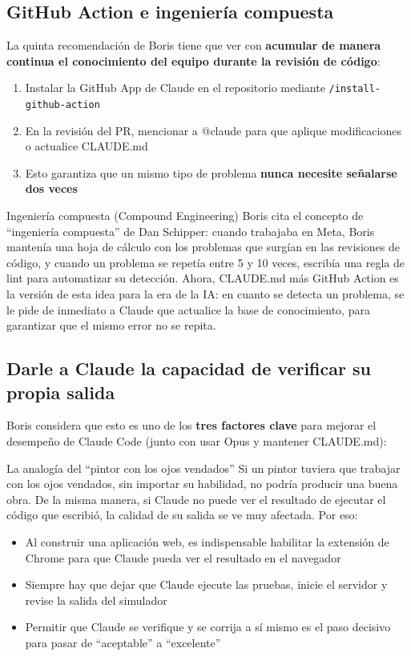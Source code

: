 \subsection{GitHub Action e ingeniería compuesta}

La quinta recomendación de Boris tiene que ver con \textbf{acumular de manera continua el conocimiento del equipo durante la revisión de código}:

\begin{enumerate}
    \item Instalar la GitHub App de Claude en el repositorio mediante \texttt{/install-github-action}
    \item En la revisión del PR, mencionar a @claude para que aplique modificaciones o actualice CLAUDE.md
    \item Esto garantiza que un mismo tipo de problema \textbf{nunca necesite señalarse dos veces}
\end{enumerate}

\begin{knowledgebox}{Ingeniería compuesta (Compound Engineering)}
Boris cita el concepto de ``ingeniería compuesta'' de Dan Schipper: cuando trabajaba en Meta, Boris mantenía una hoja de cálculo con los problemas que surgían en las revisiones de código, y cuando un problema se repetía entre 5 y 10 veces, escribía una regla de lint para automatizar su detección. Ahora, CLAUDE.md más GitHub Action es la versión de esta idea para la era de la IA: en cuanto se detecta un problema, se le pide de inmediato a Claude que actualice la base de conocimiento, para garantizar que el mismo error no se repita.
\end{knowledgebox}

\subsection{Darle a Claude la capacidad de verificar su propia salida}

Boris considera que esto es uno de los \textbf{tres factores clave} para mejorar el desempeño de Claude Code (junto con usar Opus y mantener CLAUDE.md):

\begin{warningbox}{La analogía del ``pintor con los ojos vendados''}
Si un pintor tuviera que trabajar con los ojos vendados, sin importar su habilidad, no podría producir una buena obra. De la misma manera, si Claude no puede ver el resultado de ejecutar el código que escribió, la calidad de su salida se ve muy afectada. Por eso:
\begin{itemize}
    \item Al construir una aplicación web, es indispensable habilitar la extensión de Chrome para que Claude pueda ver el resultado en el navegador
    \item Siempre hay que dejar que Claude ejecute las pruebas, inicie el servidor y revise la salida del simulador
    \item Permitir que Claude se verifique y se corrija a sí mismo es el paso decisivo para pasar de ``aceptable'' a ``excelente''
\end{itemize}
\end{warningbox}

